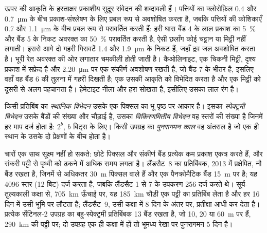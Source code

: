ऊपर की आकृति के हस्ताक्षर प्रकाशीय सुदूर
संवेदन की शब्दावली हैं। पत्तियों का क्लोरोफ़िल 0.4 और
\qty{0.7}{\micro\metre} के बीच प्रकाश-संश्लेषण के लिए प्रबल रूप से अवशोषित करता है, जबकि पत्तियों की कोशिकाएँ
0.7 और \qty{1.1}{\micro\metre} के बीच प्रबल रूप से परावर्तित करती हैं: हरी घास
बैंड 4 के लाल प्रकाश का \qty{5}{\percent} और बैंड 5 के निकट अवरक्त का \qty{50}{\percent}
परावर्तित करती है, ऐसी छलाँग कोई चट्टान या मिट्टी नहीं लगाती। इससे आगे
दो गहरी गिरावटें 1.4 और \qty{1.9}{\micro\metre} के निकट हैं, जहाँ द्रव जल
अवशोषित करता है। भूरी रेत अवरक्त की ओर लगातार चमकीली होती जाती है। कैओलिनाइट,
एक चिकनी मिट्टी, दृश्य प्रकाश में सफ़ेद है और
\qty{2.20}{\micro\metre} पर एक संकीर्ण अवशोषण रखती है, जो बैंड 7 के भीतर है, इसलिए वहाँ
वह बैंड 6 की तुलना में गहरी दिखती है; एक  उसकी आकृति को
विभेदित करता है और एक मिट्टी को दूसरी से अलग पहचानता है। हेमेटाइट नीला और हरा सोखता है, इसीलिए उसका लाल रंग है।

\begin{definition}\label{def:b3:remote-sensing-gis:resolutions}
किसी प्रतिबिंब का \emph{स्थानिक विभेदन} उसके एक पिक्सल का
भू-पृष्ठ पर आकार है। इसका \emph{स्पेक्ट्रमी
विभेदन} उसके बैंडों की संख्या और चौड़ाई है, उसका
\emph{विकिरणमितीय विभेदन} वह स्तरों की संख्या है जिनमें
हर माप दर्ज होता है: $2^b$, $b$ बिट्स के लिए।
किसी उपग्रह का \emph{पुनरागमन काल} वह अंतराल है
जो एक ही स्थान के उसके दो प्रेक्षणों के बीच होता है।
\end{definition}

चारों एक साथ सूक्ष्म नहीं हो सकते: छोटे पिक्सल और संकीर्ण बैंड
प्रत्येक कम प्रकाश एकत्र करते हैं, और संकरी पट्टी से पृथ्वी को ढकने में अधिक समय लगता है।
लैंडसैट~8 का प्रतिबिंबक, 2013 में प्रक्षेपित, नौ बैंड रखता है, जिनमें से अधिकतर
\qty{30}{m} पिक्सल वाले हैं और एक पैनक्रोमैटिक बैंड \qty{15}{m} पर है; यह
4096 स्तर (12 बिट) दर्ज करता है, जबकि लैंडसैट 1 से 7 के उपकरण 256 दर्ज करते थे।
सूर्य-तुल्यकाली कक्षा से, \qty{705}{km} ऊँचाई पर, यह
\qty{185}{km} चौड़ी एक पट्टी का प्रतिबिंब लेता है और हर 16 दिन में उसी भूमि पर लौटता है;
लैंडसैट~9, उसी कक्षा में 8 दिन के अंतर पर, प्रतीक्षा आधी कर देता है।
प्रत्येक सेंटिनल-2 उपग्रह का बहु-स्पेक्ट्रमी प्रतिबिंबक 13 बैंड रखता है, जो 10, 20
या \qty{60}{m} पर हैं, \qty{290}{km} की पट्टी पर; दो उपग्रह एक ही
कक्षा में हों तो भूमध्य रेखा पर पुनरागमन 5 दिन है।

